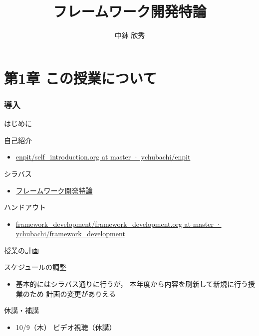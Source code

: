 \documentclass[t, aspectratio=169]{beamer}
\date{\insertpart}
\institute[AIIT]{産業技術大学院大学(AIIT)}
\author{中鉢 欣秀}
\date{}
\title{フレームワーク開発特論}
\begin{document}
\maketitle

\part{第1章 この授業について}
\label{sec-1}
\section{導入}
\label{sec-1-1}
\begin{frame}[label=sec-1-1-1]{はじめに}
\begin{block}{自己紹介}
\begin{itemize}
\item \href{https://github.com/ychubachi/enpit/blob/master/slides/self_introduction.org}{enpit/self\_introduction.org at master · ychubachi/enpit}
\end{itemize}
\end{block}

\begin{block}{シラバス}
\begin{itemize}
\item \href{http://aiit.ac.jp/master_program/isa/lecture/pdf/h26/4_6.pdf}{フレームワーク開発特論}
\end{itemize}
\end{block}

\begin{block}{ハンドアウト}
\begin{itemize}
\item \href{https://github.com/ychubachi/framework_development/blob/master/slides/framework_development.org}{framework\_development/framework\_development.org at master · ychubachi/framework\_development}
\end{itemize}
\end{block}
\end{frame}

\begin{frame}[label=sec-1-1-2]{授業の計画}
\begin{block}{スケジュールの調整}
\begin{itemize}
\item 基本的にはシラバス通りに行うが，
本年度から内容を刷新して新規に行う授業のため
計画の変更がありえる
\end{itemize}
\end{block}

\begin{block}{休講・補講}
\begin{itemize}
\item 10/9（木） ビデオ視聴（休講）
\end{itemize}
\end{block}
\end{frame}
\end{document}
